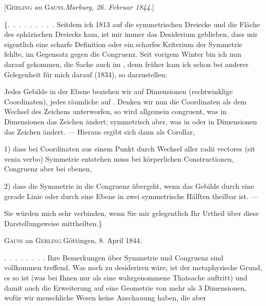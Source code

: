 %
\begin{center}
[\textsc{Gerling} \emph{an} \textsc{Gauss}.\quad \emph{Marburg, 26. Februar 1844.}]
\end{center}

\{\mbox{.\ .\ .\ .\ .\ .\ .\ .\ .} Seitdem ich 1813 auf die symmetrischen Dreiecke und die Fläche
des sphärischen Dreiecks kam, ist mir immer das Desiderium geblieben, dass
mir eigentlich eine scharfe Definition oder ein scharfes Kriterium der
Symmetrie fehlte, im Gegensatz gegen die Congruenz. Seit vorigem Winter bin
ich nun darauf gekommen, die Sache auch im , denn früher kam ich
schon bei anderer Gelegenheit für mich darauf (1834), so darzustellen:

Jedes Gebilde in der Ebene beziehen wir auf  Dimensionen (rechtwinklige Coordinaten), jedes räumliche auf
. Denken wir nun die Coordinaten als dem Wechsel des Zeichens unterworfen,
so wird allgemein congruent, was in  Dimensionen das Zeichen ändert;
symmetrisch aber, was in  oder in  Dimensionen das Zeichen ändert. --- Hieraus ergibt sich dann als Corollar,

1) dass bei Coordinaten aus einem Punkt durch Wechsel aller radii vectores
(sit venia verbo) Symmetrie entstehen muss bei körperlichen Constructionen,
Congruenz aber bei ebenen,

2) dass die Symmetrie in die Congruenz übergeht, wenn das Gebilde durch eine
gerade Linie oder durch eine Ebene in zwei symmetrische Hälften theilbar
ist. ---

Sie würden mich sehr verbinden, wenn Sie mir gelegentlich Ihr Urtheil über
diese Darstellungsweise mittheilten.\}

\par\bigskip

\begin{center}
\textsc{Gauss} an \textsc{Gerling}.\quad Göttingen, 8. April 1844.
\end{center}

\mbox{.\ .\ .\ .\ .\ .\ .\ .} Ihre Bemerkungen über Symmetrie und Congruenz sind vollkommen
treffend. Was noch zu desideriren wäre, ist der metaphysische Grund,
 es so ist (was bei Ihnen nur als eine wahrgenommene Thatsache auftritt)
und damit auch die Erweiterung auf eine Geometrie von mehr als 3
Dimensionen, wofür wir menschliche Wesen keine Anschauung haben, die aber
